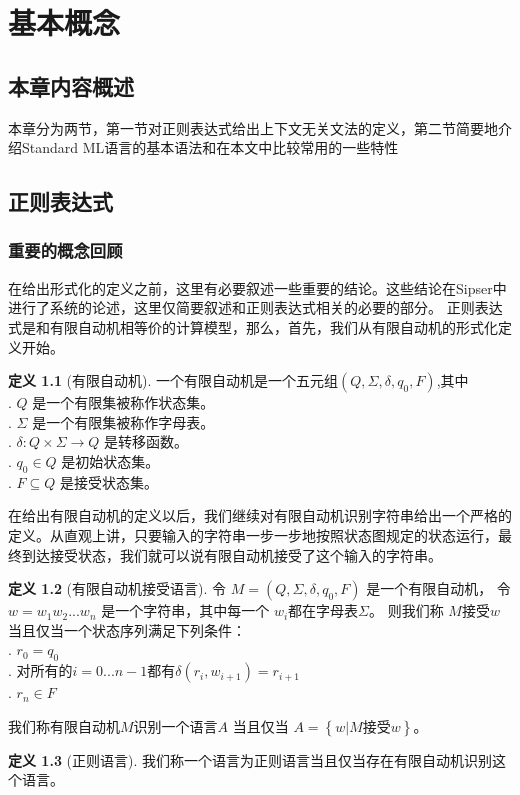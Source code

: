 \documentclass[openany,oneside]{book}
\theoremstyle{definition}
\newtheorem{definition}{\hspace{2em}定义}[chapter]
\begin{document}
\chapter{基本概念}
\section{本章内容概述}
	本章分为两节，第一节对正则表达式给出上下文无关文法的定义，第二节简要地介绍Standard ML语言的基本语法和在本文中比较常用的一些特性

\section{正则表达式}
\subsection{重要的概念回顾}
	在给出形式化的定义之前，这里有必要叙述一些重要的结论。这些结论在Sipser\cite{Sips05a}中进行了系统的论述，这里仅简要叙述和正则表达式相关的必要的部分。
	正则表达式是和有限自动机相等价的计算模型，那么，首先，我们从有限自动机的形式化定义开始。
	\begin{definition}[有限自动机]
		一个有限自动机是一个五元组\(\left( Q,\Sigma,\delta,q_0,F\right) \),其中\\
		\indent {}. \(Q\) 是一个有限集被称作状态集。\\
		\indent {}. \(\Sigma\) 是一个有限集被称作字母表。\\
		\indent {}. \(\delta : Q \times \Sigma \rightarrow Q\) 是转移函数。\\
		\indent {}. \(q_0 \in Q\) 是初始状态集。\\
		\indent {}. \(F \subseteq Q\) 是接受状态集。
	\end{definition}
	在给出有限自动机的定义以后，我们继续对有限自动机识别字符串给出一个严格的定义。从直观上讲，只要输入的字符串一步一步地按照状态图规定的状态运行，最终到达接受状态，我们就可以说有限自动机接受了这个输入的字符串。
	\begin{definition}[有限自动机接受语言]
		令 \(M = \left( Q,\Sigma,\delta,q_0,F\right)\) 是一个有限自动机， 令 \( w = w_1 w_2 ... w_n\) 是一个字符串，其中每一个 \(w_i\)都在字母表\(\Sigma\)。 则我们称 \(M\)接受\(w\)当且仅当一个状态序列满足下列条件：\\
		\indent {}. \(r_0 = q_0\)\\
		\indent {}. 对所有的\(i = 0... n -1\)都有\(\delta \left( r_i, w_{i+1}\right) = r_{i+1}\)\\
		\indent {}. \(r_n \in F\)
	\end{definition}
	我们称有限自动机\(M\)识别一个语言\(A\) 当且仅当 \(A = \left\lbrace w | M \mbox{接受} w\right\rbrace \)。\\
	\begin{definition}[正则语言]
		我们称一个语言为正则语言当且仅当存在有限自动机识别这个语言。
	\end{definition}
	
\end{document}
